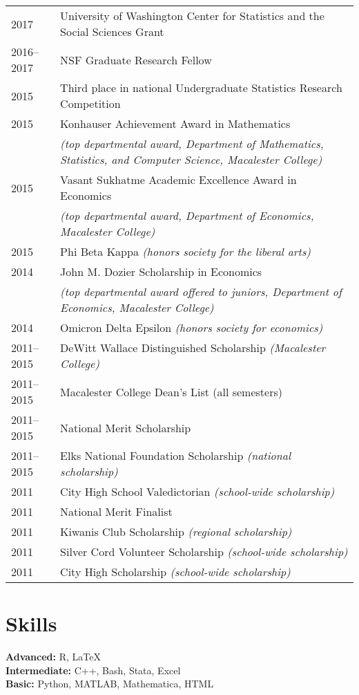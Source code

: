 \documentclass[margin,centered]{res}
\begin{document}
\begin{resume}
\begin{tabular}{@{}p{0.8in}p{4in}}
2017 & University of Washington Center for Statistics and the Social Sciences Grant\\
2016--2017 & NSF Graduate Research Fellow\\
2015 & Third place in national Undergraduate Statistics Research Competition\\
2015 & Konhauser Achievement Award in Mathematics \\
&\textit{(top departmental award, Department of Mathematics, Statistics, and Computer Science, Macalester College)}\\
2015 & Vasant Sukhatme Academic Excellence Award in Economics\\& \textit{(top departmental award, Department of Economics, Macalester College)}\\
2015 & Phi Beta Kappa \textit{(honors society for the liberal arts)}\\
2014 & John M. Dozier Scholarship in Economics \\ &\textit{(top departmental award offered to juniors, Department of Economics, Macalester College)}\\
2014 & Omicron Delta Epsilon \textit{(honors society for economics)}\\
2011--2015 & DeWitt Wallace Distinguished Scholarship \textit{(Macalester College)}\\
2011--2015 & Macalester College Dean's List (all semesters)\\
2011--2015 & National Merit Scholarship \\
2011--2015 & Elks National Foundation Scholarship \textit{(national scholarship)}\\
2011 & City High School Valedictorian \textit{(school-wide scholarship)}\\
2011 & National Merit Finalist\\ 
2011 & Kiwanis Club Scholarship \textit{(regional scholarship)}\\
2011 & Silver Cord Volunteer Scholarship \textit{(school-wide scholarship)}\\
2011 & City High Scholarship \textit{(school-wide scholarship)}\\
\end{tabular}





\section{\sc Skills}
{\bf Advanced:} R, LaTeX\\
{\bf Intermediate:} C++, Bash, Stata, Excel\\
{\bf Basic:} Python, MATLAB, Mathematica, HTML



\end{resume}
\end{document}
